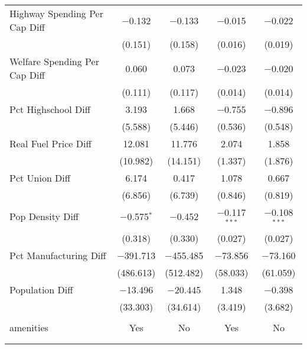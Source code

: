 \begin{table}[!htbp]
\begin{tabular}{@{\extracolsep{5pt}}lcccc}
  Highway Spending Per Cap Diff & $-$0.132 & $-$0.133 & $-$0.015 & $-$0.022 \\ 
  & (0.151) & (0.158) & (0.016) & (0.019) \\ 
  Welfare Spending Per Cap Diff & 0.060 & 0.073 & $-$0.023 & $-$0.020 \\ 
  & (0.111) & (0.117) & (0.014) & (0.014) \\ 
  Pct Highschool Diff & 3.193 & 1.668 & $-$0.755 & $-$0.896 \\ 
  & (5.588) & (5.446) & (0.536) & (0.548) \\ 
  Real Fuel Price Diff & 12.081 & 11.776 & 2.074 & 1.858 \\ 
  & (10.982) & (14.151) & (1.337) & (1.876) \\ 
  Pct Union Diff & 6.174 & 0.417 & 1.078 & 0.667 \\ 
  & (6.856) & (6.739) & (0.846) & (0.819) \\ 
  Pop Density Diff & $-$0.575$^{*}$ & $-$0.452 & $-$0.117$^{***}$ & $-$0.108$^{***}$ \\ 
  & (0.318) & (0.330) & (0.027) & (0.027) \\ 
  Pct Manufacturing Diff & $-$391.713 & $-$455.485 & $-$73.856 & $-$73.160 \\ 
  & (486.613) & (512.482) & (58.033) & (61.059) \\ 
  Population Diff & $-$13.496 & $-$20.445 & 1.348 & $-$0.398 \\ 
  & (33.303) & (34.614) & (3.419) & (3.682) \\ 
 \hline \\[-1.8ex] 
amenities & Yes & No & Yes & No \\ 
\hline \\[-1.8ex] 
\hline 
\hline \\[-1.8ex] 
\end{tabular} 
\end{table} 
